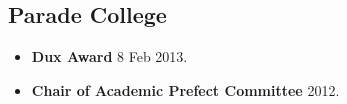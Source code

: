 \begin{multicols}{2}
\subsection{Parade College}

\begin{itemize}
  \item \textbf{Dux Award} 8 Feb 2013. 
  \item \textbf{Chair of Academic Prefect Committee} 2012.
\end{itemize}

\vspace*{\fill}

\end{multicols}